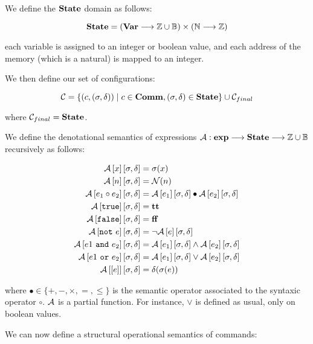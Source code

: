 We define the $\mathbf{State}{}$ domain as follows:

\[
\mathbf{State}{} = \left(\mathbf{Var}{}  \longrightarrow \mathbb{Z} \cup \mathbb{B} \right) \times \left( \mathbb{N} \longrightarrow \mathbb{Z} \right)
\]

\ie{} each variable is assigned to an integer or boolean  value, and each address of the memory (which is a natural) is mapped to an integer.

We then define our set of configurations:

\[
\mathcal{C} = \lbrace \left( c, (\sigma, \delta) \right) \mid c \in \mathbf{Comm}{}, (\sigma, \delta) \in \mathbf{State}{} \rbrace \cup \mathcal{C}_{final}
\]

where $\mathcal{C}_{final} = \mathbf{State}{}$.

We define the denotational semantics of expressions $\mathcal{A}{}: \mathbf{exp}{} \longrightarrow \mathbf{State}{} \longrightarrow \mathbb{Z} \cup \mathbb{B}$ recursively as follows:

\begin{align*}
	\mathcal{A}\left[x\right]\left[\sigma, \delta\right] &= \sigma(x) \\
	\mathcal{A}\left[n\right]\left[\sigma, \delta\right] &= \mathcal{N}(n) \\
	\mathcal{A}\left[e_1 \circ e_2\right]\left[\sigma, \delta\right] &= \mathcal{A}\left[e_1\right]\left[\sigma, \delta\right] \bullet \mathcal{A}\left[e_2\right]\left[\sigma, \delta\right] \\
	\mathcal{A}\left[\texttt{true}\right]\left[\sigma, \delta\right] &= \mathbf{tt}{} \\
	\mathcal{A}\left[\texttt{false}\right]\left[\sigma, \delta\right] &= \mathbf{ff}{} \\
	\mathcal{A}\left[\texttt{not}~e\right]\left[\sigma, \delta\right] &= \neg \mathcal{A}\left[e\right]\left[\sigma, \delta\right] \\
	\mathcal{A}\left[e1~\texttt{and}~e_2\right]\left[\sigma, \delta\right] &= \mathcal{A}\left[e_1\right]\left[\sigma, \delta\right] \wedge \mathcal{A}\left[e_2\right]\left[\sigma, \delta\right] \\
	\mathcal{A}\left[e1~\texttt{or}~e_2\right]\left[\sigma, \delta\right] &= \mathcal{A}\left[e_1\right]\left[\sigma, \delta\right] \vee \mathcal{A}\left[e_2\right]\left[\sigma, \delta\right] \\
	\mathcal{A}\left[[e]\right]\left[\sigma, \delta\right] &= \delta(\sigma(e)) \\
\end{align*}

where $\bullet \in \lbrace +, -, \times, =, \leq \rbrace$ is the semantic operator associated to the syntaxic operator $\circ$. $\mathcal{A}{}$ is a partial function. For instance, $\vee$ is defined as usual, only on boolean values.

We can now define a structural operational semantics of commands:

